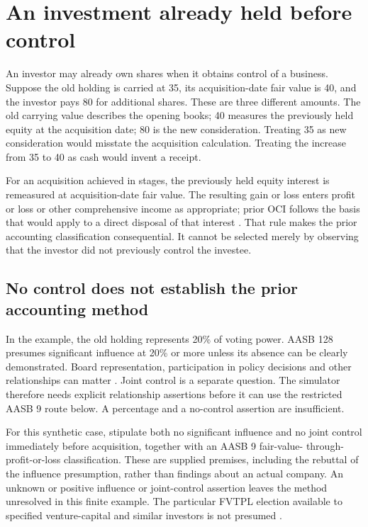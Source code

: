 \section{An investment already held before control}
\label{sec:worked-prior-equity}

An investor may already own shares when it obtains control of a business.
Suppose the old holding is carried at 35, its acquisition-date fair value is
40, and the investor pays 80 for additional shares. These are three different
amounts. The old carrying value describes the opening books; 40 measures the
previously held equity at the acquisition date; 80 is the new consideration.
Treating 35 as new consideration would misstate the acquisition calculation.
Treating the increase from 35 to 40 as cash would invent a receipt.

For an acquisition achieved in stages, the previously held equity interest is
remeasured at acquisition-date fair value. The resulting gain or loss enters
profit or loss or other comprehensive income as appropriate; prior OCI follows
the basis that would apply to a direct disposal of that interest
\citep[paras.~41--42]{aasb3scope2026}. That rule makes the prior accounting
classification consequential. It cannot be selected merely by observing that
the investor did not previously control the investee.

\subsection{No control does not establish the prior accounting method}

In the example, the old holding represents 20\% of voting power. AASB 128
presumes significant influence at 20\% or more unless its absence can be
clearly demonstrated. Board representation, participation in policy decisions
and other relationships can matter \citep[paras.~5--8]{aasb128prior2025}.
Joint control is a separate question. The simulator therefore needs explicit
relationship assertions before it can use the restricted AASB 9 route below.
A percentage and a no-control assertion are insufficient.

For this synthetic case, stipulate both no significant influence and no joint
control immediately before acquisition, together with an AASB 9 fair-value-
through-profit-or-loss classification. These are supplied premises, including
the rebuttal of the influence presumption, rather than findings about an actual
company. An unknown or positive influence or joint-control assertion leaves
the method unresolved in this finite example. The particular FVTPL election
available to specified venture-capital and similar investors is not presumed
\citep[para.~18]{aasb128prior2025}.

